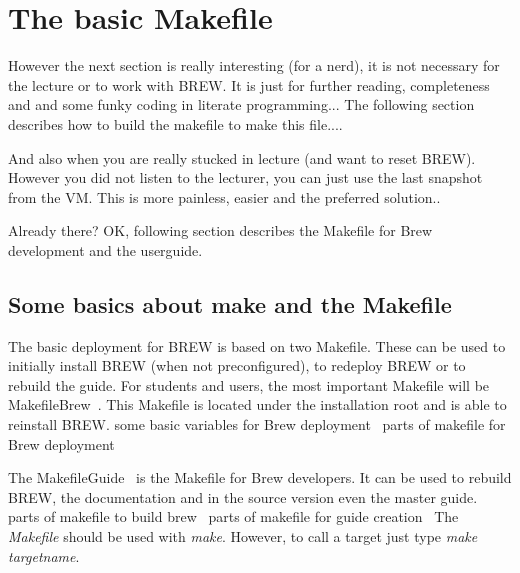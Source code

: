 \documentclass{llncs}%
\begin{document}
\section{The basic Makefile}
However the next section is really interesting (for a nerd), it is not necessary for the lecture or to work with BREW. It is just for further reading, completeness and and some funky coding in literate programming...
The following section describes how to build the makefile to make this file....

And also when you are really stucked in lecture (and want to reset BREW). However you did not listen to the lecturer, you can just use the last snapshot from the VM. This is more painless, easier and the preferred solution..

Already there? OK, following section describes the Makefile for Brew development and the userguide.

\subsection{Some basics about make and the Makefile}
The basic deployment for BREW is based on two Makefile.
These can be used to initially install BREW (when not preconfigured), to redeploy BREW or to rebuild the guide.
For students and users, the most important Makefile will be {\Tt{}\LA{}MakefileBrew~{\nwtagstyle{}}\RA{}\nwendquote}. This Makefile is located under the installation root and is able to reinstall BREW.
\nwenddocs{}\endmoddef\nwstartdeflinemarkup\nwenddeflinemarkup
\LA{}some basic variables for Brew deployment~{\nwtagstyle{}}\RA{}
\LA{}parts of makefile for Brew deployment~{\nwtagstyle{}}\RA{}
\nwendcode{}\nwdocspar

The {\Tt{}\LA{}MakefileGuide~{\nwtagstyle{}}\RA{}\nwendquote} is the Makefile for Brew developers. It can be used to rebuild BREW, the documentation and in the source version even the master guide.
\nwenddocs{}\endmoddef\nwstartdeflinemarkup\nwenddeflinemarkup
\LA{}parts of makefile to build brew~{\nwtagstyle{}}\RA{}
\LA{}parts of makefile for guide creation~{\nwtagstyle{}}\RA{}
\nwendcode{}\nwdocspar
The {\em Makefile} should be used with {\em make}. However, to call a target just type {\em make \it targetname}.
\end{document}
